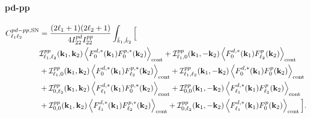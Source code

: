 \documentclass[a4paper,11pt]{article}
\begin{document}
\paragraph{pd-pp}
\begin{align}
C^{pd-pp,{\rm SN}}_{\ell_1\ell_2}
&=
\frac{(2\ell_1+1)(2\ell_2+1)}
{4I^{pd}_{22}I^{pp}_{22}}
\int_{\hat k_1,\hat k_2}
\Big[
\nonumber\\
&\mathcal I^{pp}_{\ell_1,\ell_2}(\mathbf k_1,\mathbf k_2)
\left\langle
F^{d,*}_{0}(\mathbf k_1)F^{p,*}_{0}(\mathbf k_2)
\right\rangle_{\rm cont} +
\mathcal I^{pp}_{\ell_1,0}(\mathbf k_1,-\mathbf k_2)
\left\langle
F^{d,*}_{0}(\mathbf k_1)F^p_{\ell_2}(\mathbf k_2)
\right\rangle_{\rm cont}
\nonumber\\
&+
\mathcal I^{pp}_{\ell_1,0}(\mathbf k_1,\mathbf k_2)
\left\langle
F^{d,*}_{0}(\mathbf k_1)F^{p,*}_{\ell_2}(\mathbf k_2)
\right\rangle_{\rm cont} +
\mathcal I^{pp}_{\ell_1,\ell_2}(\mathbf k_1,-\mathbf k_2)
\left\langle
F^{d,*}_{0}(\mathbf k_1)F^p_{0}(\mathbf k_2)
\right\rangle_{\rm cont}
\nonumber\\
&+
\mathcal I^{pp}_{0,\ell_2}(\mathbf k_1,\mathbf k_2)
\left\langle
F^{d,*}_{\ell_1}(\mathbf k_1)F^{p,*}_{0}(\mathbf k_2)
\right\rangle_{\rm cont}+
\mathcal I^{pp}_{0,0}(\mathbf k_1,-\mathbf k_2)
\left\langle
F^{d,*}_{\ell_1}(\mathbf k_1)F^p_{\ell_2}(\mathbf k_2)
\right\rangle_{\rm cont}
\nonumber\\
&+
\mathcal I^{pp}_{0,0}(\mathbf k_1,\mathbf k_2)
\left\langle
F^{d,*}_{\ell_1}(\mathbf k_1)F^{p,*}_{\ell_2}(\mathbf k_2)
\right\rangle_{\rm cont}+
\mathcal I^{pp}_{0,\ell_2}(\mathbf k_1,-\mathbf k_2)
\left\langle
F^{d,*}_{\ell_1}(\mathbf k_1)F^p_{0}(\mathbf k_2)
\right\rangle_{\rm cont}
\Big].
\end{align}
\end{document}
